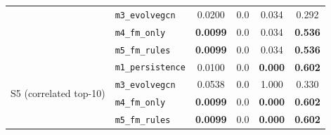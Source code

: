 \begin{table}[!htbp]
\begin{tabular}{l l c c c c}
& \texttt{m3\_evolvegcn}   & 0.0200 & 0.0 & 0.034 & 0.292 \\
& \texttt{m4\_fm\_only}    & \textbf{0.0099} & 0.0 & 0.034 & \textbf{0.536} \\
& \texttt{m5\_fm\_rules}   & \textbf{0.0099} & 0.0 & 0.034 & \textbf{0.536} \\
\midrule
\multirow{4}{*}{S5 (correlated top-10)}
& \texttt{m1\_persistence} & 0.0100 & 0.0 & \textbf{0.000} & \textbf{0.602} \\
& \texttt{m3\_evolvegcn}   & 0.0538 & 0.0 & 1.000 & 0.330 \\
& \texttt{m4\_fm\_only}    & \textbf{0.0099} & 0.0 & \textbf{0.000} & \textbf{0.602} \\
& \texttt{m5\_fm\_rules}   & \textbf{0.0099} & 0.0 & \textbf{0.000} & \textbf{0.602} \\
\bottomrule
\end{tabular}
\end{table}
